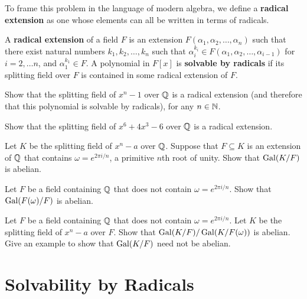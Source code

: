 To frame this problem in the language of modern algebra, we define a \textbf{radical extension} as one whose elements can all be written in terms of radicals.

\begin{definition}
    A \textbf{radical extension} of a field $F$ is an extension $F(\alpha_1,\alpha_2, \ldots, \alpha_n)$ such that there exist natural numbers $k_1,k_2,\ldots,k_n$ such that $\alpha_{i}^{k_i} \in F(\alpha_1,\alpha_2, \ldots, \alpha_{i-1})$ for $i = 2,\ldots n$, and $\alpha_1^{k_1} \in F$. A polynomial in $F[x]$ is \textbf{solvable by radicals} if its splitting field over $F$ is contained in some radical extension of $F$.
\end{definition}

\begin{problem}
Show that the splitting field of $x^n-1$ over $\mathbb{Q}$ is a radical extension (and therefore that this polynomial is solvable by radicals), for any $n\in \mathbb{N}$.
\end{problem}



\begin{problem}
Show that the splitting field of $x^6+4x^3-6$ over $\mathbb{Q}$ is a radical extension.
\end{problem}



\begin{problem}
    Let $K$ be the splitting field of $x^n-a$ over $\mathbb{Q}$. Suppose that $F\subseteq K$ is an extension of $\mathbb{Q}$ that contains $\omega = e^{2\pi i/n}$, a primitive $n$th root of unity. Show that $\operatorname{Gal}(K/F)$ is abelian.
\end{problem}



\begin{problem}
    Let $F$ be a field containing $\mathbb{Q}$ that does not contain $\omega = e^{2\pi i/n}$. Show that $\operatorname{Gal}(F(\omega)/F)$ is abelian.
\end{problem}



\begin{problem}
    Let $F$ be a field containing $\mathbb{Q}$ that does not contain $\omega = e^{2\pi i/n}$. Let $K$ be the splitting field of $x^n-a$ over $F$. Show that $\operatorname{Gal}(K/F)/\operatorname{Gal}(K/F(\omega))$ is abelian. Give an example to show that $\operatorname{Gal}(K/F)$ need not be abelian.
\end{problem}


\section{Solvability by Radicals}

